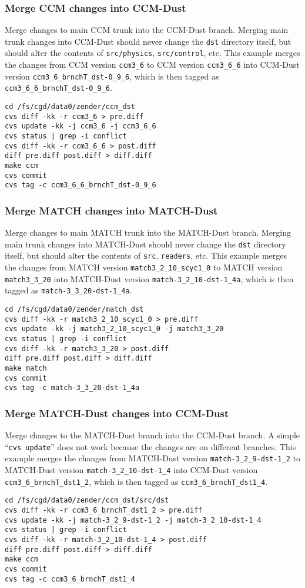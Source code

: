 \documentclass[12pt,twoside]{article}
\begin{document}
\subsubsection[Merge CCM into CCM-Dust]{Merge CCM changes into CCM-Dust}
Merge changes to main CCM trunk into the CCM-Dust branch. 
Merging main trunk changes into CCM-Dust should never change the
\verb'dst' directory itself, but should alter the contents of
\verb'src/physics', \verb'src/control', etc. 
This example merges the changes from CCM version
\verb'ccm3_6' to CCM version
\verb'ccm3_6_6' into CCM-Dust version
\verb'ccm3_6_brnchT_dst-0_9_6', which is then tagged as
\verb'ccm3_6_6_brnchT_dst-0_9_6'. 
\begin{verbatim}
cd /fs/cgd/data0/zender/ccm_dst
cvs diff -kk -r ccm3_6 > pre.diff
cvs update -kk -j ccm3_6 -j ccm3_6_6
cvs status | grep -i conflict
cvs diff -kk -r ccm3_6_6 > post.diff
diff pre.diff post.diff > diff.diff
make ccm
cvs commit 
cvs tag -c ccm3_6_6_brnchT_dst-0_9_6
\end{verbatim}

\subsubsection[Merge MATCH into MATCH-Dust]{Merge MATCH changes into MATCH-Dust}
Merge changes to main MATCH trunk into the MATCH-Dust branch. 
Merging main trunk changes into MATCH-Dust should never change the
\verb'dst' directory itself, but should alter the contents of
\verb'src', \verb'readers', etc. 
This example merges the changes from MATCH version
\verb'match3_2_10_scyc1_0' to MATCH version
\verb'match3_3_20' into MATCH-Dust version
\verb'match-3_2_10-dst-1_4a', which is then tagged as
\verb'match-3_3_20-dst-1_4a'. 
\begin{verbatim}
cd /fs/cgd/data0/zender/match_dst
cvs diff -kk -r match3_2_10_scyc1_0 > pre.diff
cvs update -kk -j match3_2_10_scyc1_0 -j match3_3_20
cvs status | grep -i conflict
cvs diff -kk -r match3_3_20 > post.diff
diff pre.diff post.diff > diff.diff
make match
cvs commit 
cvs tag -c match-3_3_20-dst-1_4a
\end{verbatim}

\subsubsection[Merge MATCH-Dust into CCM-Dust]{Merge MATCH-Dust changes into CCM-Dust}
Merge changes to the MATCH-Dust branch into the CCM-Dust branch. 
A simple ``\texttt{cvs update}'' does not work because the changes are
on different branches.
This example merges the changes from MATCH-Dust version
\verb'match-3_2_9-dst-1_2' to MATCH-Dust version
\verb'match-3_2_10-dst-1_4' into CCM-Dust version
\verb'ccm3_6_brnchT_dst1_2', which is then tagged as
\verb'ccm3_6_brnchT_dst1_4'.  
\begin{verbatim}
cd /fs/cgd/data0/zender/ccm_dst/src/dst
cvs diff -kk -r ccm3_6_brnchT_dst1_2 > pre.diff
cvs update -kk -j match-3_2_9-dst-1_2 -j match-3_2_10-dst-1_4
cvs status | grep -i conflict
cvs diff -kk -r match-3_2_10-dst-1_4 > post.diff
diff pre.diff post.diff > diff.diff
make ccm
cvs commit 
cvs tag -c ccm3_6_brnchT_dst1_4
\end{verbatim}
\end{document}
